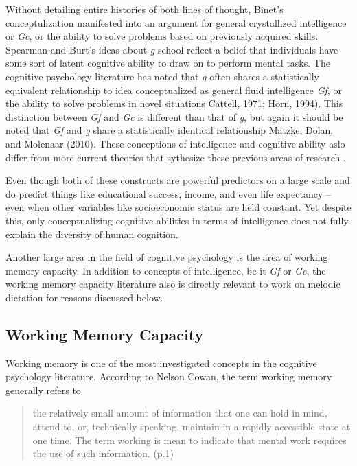 \documentclass[]{book}
\begin{document}
Without detailing entire histories of both lines of thought, Binet's conceptulization manifested into an argument for general crystallized intelligence or \emph{Gc}, or the ability to solve problems based on previously acquired skills.
Spearman and Burt's ideas about \emph{g} school reflect a belief that individuals have some sort of latent cognitive ability to draw on to perform mental tasks.
The cognitive psychology literature has noted that \emph{g} often shares a statistically equivalent relationship to idea conceptualized as general fluid intelligence \emph{Gf}, or the ability to solve problems in novel situations Cattell, 1971; Horn, 1994).
This distinction between \emph{Gf} and \emph{Gc} is different than that of \emph{g}, but again it should be noted that \emph{Gf} and \emph{g} share a statistically identical relationship Matzke, Dolan, and Molenaar (2010).
These conceptions of intelligenec and cognitive ability aslo differ from more current theories that sythesize these previous areas of research \citep{kovacsProcessOverlapTheory2016}.

Even though both of these constructs are powerful predictors on a large scale and do predict things like educational success, income, and even life expectancy \citep{ritchieIntelligenceAllThat2015}-- even when other variables like socioeconomic status are held constant.
Yet despite this, only conceptualizing cognitive abilities in terms of intelligence does not fully explain the diversity of human cognition.

Another large area in the field of cognitive psychology is the area of working memory capacity.
In addition to concepts of intelligence, be it \emph{Gf} or \emph{Gc}, the working memory capacity literature also is directly relevant to work on melodic dictation for reasons discussed below.

\hypertarget{working-memory-capacity}{%
\subsection{Working Memory Capacity}\label{working-memory-capacity}}

Working memory is one of the most investigated concepts in the cognitive psychology literature.
According to Nelson Cowan, the term working memory generally refers to

\begin{quote}
the relatively small amount of information that one can hold in mind, attend to, or, technically speaking, maintain in a rapidly accessible state at one time. The term working is mean to indicate that mental work requires the use of such information. (p.1) \citep{cowanWorkingMemoryCapacity2005}
\end{quote}
\end{document}
